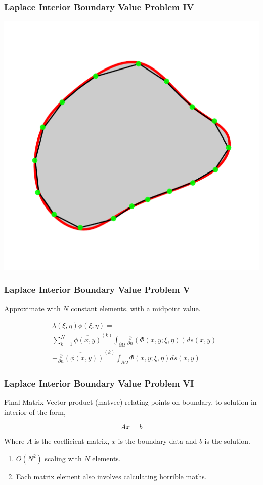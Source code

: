 \begin{frame}
    \frametitle{Laplace Interior Boundary Value Problem IV}
    \centering \includegraphics[width=0.5\linewidth]{assets/bem.pdf}
\end{frame}

\begin{frame}
    \frametitle{Laplace Interior Boundary Value Problem V}

        Approximate with $N$ constant elements, with a midpoint value.

        \begin{equation}
            \begin{aligned}
                & \lambda(\xi, \eta)\phi(\xi, \eta) = \\
                & \sum_{k=1}^N  \overline{\phi(x, y)}^{(k)} \int_{\partial \Omega} \frac{\partial}{\partial n} (\Phi(x, y; \xi, \eta)) ds(x,y) \\
                &- \overline{\frac{\partial}{\partial n}(\phi(x, y))}^{(k)}  \int_{\partial \Omega} \Phi(x, y; \xi, \eta)  ds(x, y)
            \end{aligned}
        \end{equation}
\end{frame}

\begin{frame}
    \frametitle{Laplace Interior Boundary Value Problem VI}

    Final Matrix Vector product (matvec) relating points on boundary, to solution in interior of the form,

    \begin{equation}
        Ax = b
    \end{equation}

    Where $A$ is the coefficient matrix, $x$ is the boundary data and $b$ is the solution.

    \begin{enumerate}
        \item $O(N^2)$ scaling with $N$ elements.
        \item Each matrix element also involves calculating horrible maths.
    \end{enumerate}
\end{frame}

